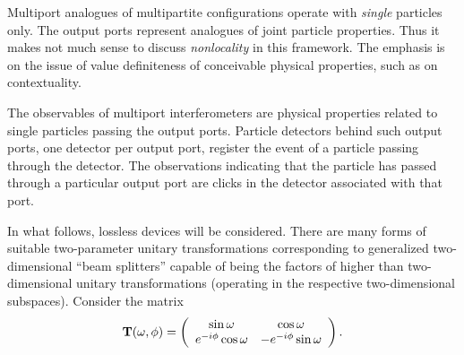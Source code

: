 \documentclass[pra,showpacs,showkeys,amsfonts]{revtex4}
\begin{document}
Multiport analogues of multipartite configurations
operate with {\em single} particles only.
The output ports represent analogues of joint particle properties.
Thus it makes not much sense to discuss {\em nonlocality} in this framework.
The emphasis is on the issue of
value definiteness of conceivable physical properties, such as
on contextuality.

The observables of multiport interferometers are
physical properties related to single particles passing
the output ports.
Particle detectors behind such output ports, one detector per output port,
register the event of
a particle passing through the detector.
The observations indicating that the particle has passed
through a particular output port are clicks in the detector associated with that port.

In what follows, lossless devices will be considered.
There are many forms of suitable two-parameter unitary transformations
corresponding to generalized two-dimensional ``beam splitters''
capable of being the factors of higher than two-dimensional unitary transformations
(operating in the respective two-dimensional subspaces).
Consider the  matrix
\begin{equation}
{\bf T}(\omega ,\phi )=
\left(
\begin{array}{cc}
\sin \omega &\cos  \omega \\
e^{-i \phi }\cos  \omega & -e^{-i \phi }\sin \omega
\end{array}
\right).
\label{2004-analog-eurm}
\end{equation}
\end{document}
